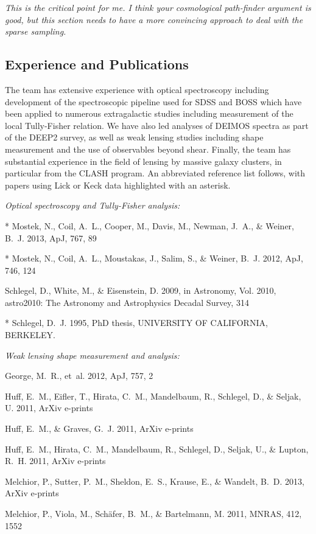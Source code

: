 \documentclass[12pt]{article}
\begin{document}
{\color{red}\it This is the critical point for me. I think your cosmological path-finder argument is good, but this section needs to have a more convincing approach to deal with the sparse sampling.}

\subsection{Experience and Publications}
The team has extensive experience with optical spectroscopy including development of the spectroscopic pipeline used for SDSS and BOSS which have been applied to numerous extragalactic studies including measurement of the local Tully-Fisher relation. We have also led analyses of DEIMOS spectra as part of the DEEP2 survey, as well as weak lensing studies including shape measurement and the use of observables beyond shear. {\color{red} Finally, the team has substantial experience in the field of lensing by massive galaxy clusters, in particular from the CLASH program.} An abbreviated reference list follows, with papers using Lick or Keck data highlighted with an asterisk.

{\small
\begin{description}
\item \textit{Optical spectroscopy and Tully-Fisher analysis:}
  \begin{description}
  \item {}, N., {Coil}, A.~L., {Cooper}, M., {Davis}, M., {Newman}, J.~A., \&
    {Weiner}, B.~J. 2013, ApJ, 767, 89
  \item {}, N., {Coil}, A.~L., {Moustakas}, J., {Salim}, S., \& {Weiner}, B.~J.
    2012, ApJ, 746, 124
  \item {Schlegel}, D., {White}, M., \& {Eisenstein}, D. 2009, in Astronomy, Vol. 2010,
    astro2010: The Astronomy and Astrophysics Decadal Survey, 314
  \item {}, D.~J. 1995, PhD thesis, UNIVERSITY OF CALIFORNIA, BERKELEY.
  \end{description}
\item \textit{Weak lensing shape measurement and analysis:}
  \begin{description}
  \item {George}, M.~R., {et~al.} 2012, ApJ, 757, 2
  \item {Huff}, E.~M., {Eifler}, T., {Hirata}, C.~M., {Mandelbaum}, R., {Schlegel}, D.,
    \& {Seljak}, U. 2011{}, ArXiv e-prints
  \item {Huff}, E.~M., \& {Graves}, G.~J. 2011, ArXiv e-prints
  \item {Huff}, E.~M., {Hirata}, C.~M., {Mandelbaum}, R., {Schlegel}, D., {Seljak}, U.,
    \& {Lupton}, R.~H. 2011{}, ArXiv e-prints
  \item {Melchior}, P., {Sutter}, P.~M., {Sheldon}, E.~S., {Krause}, E., \& {Wandelt},
    B.~D. 2013, ArXiv e-prints
  \item {Melchior}, P., {Viola}, M., {Sch{\"a}fer}, B.~M., \& {Bartelmann}, M. 2011,
    MNRAS, 412, 1552
  \end{description}
\end{description}
}
\end{document}
